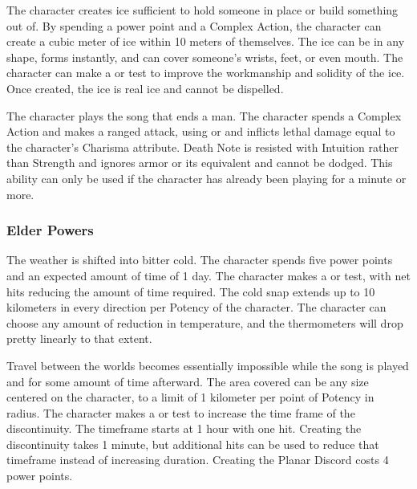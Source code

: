  The character creates ice sufficient to hold someone in place or build something out of. By spending a power point and a Complex Action, the character can create a cubic meter of ice within 10 meters of themselves. The ice can be in any shape, forms instantly, and can cover someone's wrists, feet, or even mouth. The character can make a  or  test to improve the workmanship and solidity of the ice. Once created, the ice is real ice and cannot be dispelled.

 The character plays the song that ends a man. The character spends a Complex Action and makes a ranged attack, using  or  and inflicts lethal damage equal to the character's Charisma attribute. Death Note is resisted with Intuition rather than Strength and ignores armor or its equivalent and cannot be dodged. This ability can only be used if the character has already been playing for a minute or more.


\subsubsection{Elder Powers}

 The weather is shifted into bitter cold. The character spends five power points and an expected amount of time of 1 day. The character makes a  or  test, with net hits reducing the amount of time required. The cold snap extends up to 10 kilometers in every direction per Potency of the character. The character can choose any amount of reduction in temperature, and the thermometers will drop pretty linearly to that extent.

 Travel between the worlds becomes essentially impossible while the song is played and for some amount of time afterward. The area covered can be any size centered on the character, to a limit of 1 kilometer per point of Potency in radius. The character makes a  or  test to increase the time frame of the discontinuity. The timeframe starts at 1 hour with one hit. Creating the discontinuity takes 1 minute, but additional hits can be used to reduce that timeframe instead of increasing duration. Creating the Planar Discord costs 4 power points.



